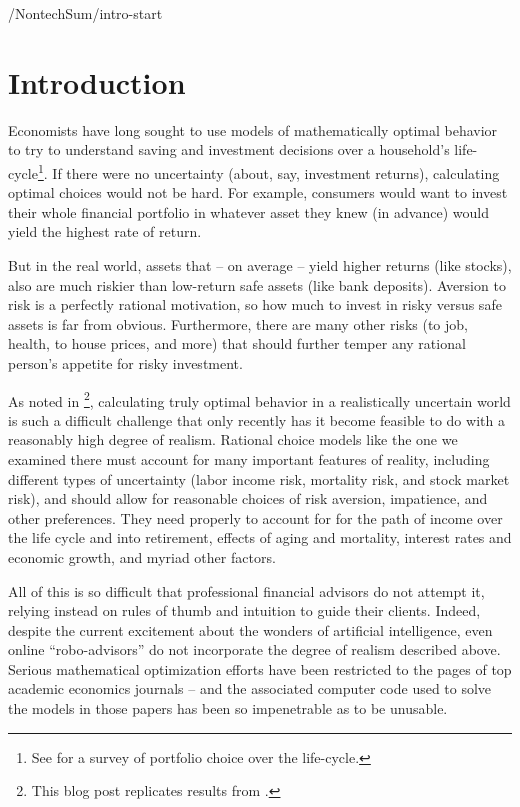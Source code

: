 \documentclass[PortfolioChoiceWithRiskyHousing]{subfiles}
\begin{document}
\begin{verbatimwrite}{\LaTeXOutput/NontechSum/intro-start}
  \section{Introduction}

  Economists have long sought to use models of mathematically optimal behavior to try to understand saving and investment decisions over a household's life-cycle\footnote{See \cite{Gomes2020a} for a survey of portfolio choice over the life-cycle.}. If there were no uncertainty (about, say, investment returns), calculating optimal choices would not be  hard.  For example, consumers would want to invest their whole financial portfolio in whatever asset they knew (in advance) would yield the highest rate of return.

  But in the real world, assets that -- on average -- yield higher returns (like stocks), also are much riskier than low-return safe assets (like bank deposits).  Aversion to risk is a perfectly rational motivation, so how much to invest in risky versus safe assets is far from obvious.  Furthermore, there are many other risks (to  job,  health, to house prices, and more) that should further temper any rational person's appetite for risky investment.

  As noted in \cite{Carroll2020}\footnote{This blog post replicates results from \cite{Cocco2005}.}, calculating truly optimal behavior in a realistically uncertain world is such a difficult challenge that only recently has it become feasible to do with a reasonably high degree of realism.  Rational choice models like the one we examined there must account for many important features of reality, including different types of uncertainty (labor income risk, mortality risk, and stock market risk), and should allow for reasonable choices of risk aversion, impatience, and other preferences.  They need properly to account for for the path of income over the life cycle and into retirement, effects of aging and mortality, interest rates and economic growth, and myriad other factors.

  All of this is so difficult that professional financial advisors do not attempt it, relying instead on rules of thumb and intuition to guide their clients.
  Indeed, despite the current excitement about the wonders of artificial intelligence, even  online ``robo-advisors'' do not incorporate the degree of realism described above.  Serious mathematical optimization efforts have been restricted to the pages of top academic economics journals -- and the associated computer code used to solve the models in those papers has been so impenetrable as to be unusable.

\end{verbatimwrite}

\end{document}
